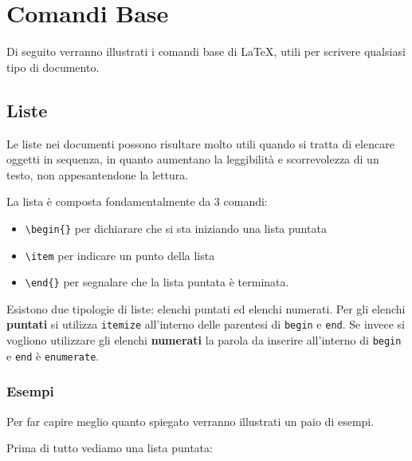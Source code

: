 \chapter{Comandi Base}

Di seguito verranno illustrati i comandi base di \LaTeX{}, utili per scrivere 
qualsiasi tipo di documento.

\section{Liste}

Le liste nei documenti possono risultare molto utili quando si tratta di 
elencare oggetti in sequenza, in quanto aumentano la leggibilità e 
scorrevolezza di un testo, non appesantendone la lettura.

La lista è composta fondamentalmente da 3 comandi:
\begin{itemize}
 \item \verb!\begin{}! per dichiarare che si sta iniziando una 
lista puntata
 \item \verb!\item! per indicare un punto della lista
 \item \verb!\end{}! per segnalare che la lista puntata è terminata.
\end{itemize}

Esistono due tipologie di liste: elenchi puntati ed elenchi numerati. Per gli 
elenchi \textbf{puntati} si utilizza \texttt{itemize} all'interno delle 
parentesi di \texttt{begin} e \texttt{end}. Se invece si vogliono utilizzare 
gli elenchi \textbf{numerati} la parola da inserire all'interno di 
\texttt{begin} e 
\texttt{end} è \texttt{enumerate}.

\subsection{Esempi}

Per far capire meglio quanto spiegato verranno illustrati un paio di esempi.

\vspace{\abovedisplayskip}
\begin{minipage}{\linewidth}
  \noindent Prima di tutto vediamo una lista puntata:
  
\end{minipage}
\vspace{\belowdisplayskip}
                          
